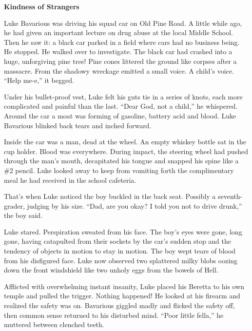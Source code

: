 

{\bf Kindness of Strangers}



Luke Bavarious was driving his squad car on Old Pine Road. A little
while ago, he had given an important lecture on drug abuse at the
local Middle School. Then he saw it: a black car parked in a field
where cars had no business being. He stopped. He walked over to
investigate. The black car had crashed into a huge, unforgiving
pine tree! Pine cones littered the ground like corpses after a
massacre. From the shadowy wreckage emitted a small voice. A
child's voice. ``Help me-e,'' it begged.



Under his bullet-proof vest, Luke felt his guts tie in a series of
knots, each more complicated and painful than the last. ``Dear
God, not a child,'' he whispered. Around the car a moat was
forming of gasoline, battery acid and blood. Luke Bavarious blinked
back tears and inched forward.



Inside the car was a man, dead at the wheel. An empty whiskey
bottle sat in the cup holder. Blood was everywhere. During impact,
the steering wheel had pushed through the man's mouth,
decapitated his tongue and snapped his spine like a \#2 pencil. Luke
looked away to keep from vomiting forth the complimentary meal he
had received in the school cafeteria.



That's when Luke noticed the boy buckled in the back seat.
Possibly a seventh-grader, judging by his size. ``Dad, are you
okay? I told you not to drive drunk,'' the boy said.



Luke stared. Perspiration sweated from his face. The boy's
eyes were gone, long gone, having catapulted from their sockets by
the car's sudden stop and the tendency of objects in motion
to stay in motion. The boy wept tears of blood from his disfigured
face. Luke now observed two splattered milky blobs oozing down the
front windshield like two unholy eggs from the bowels of
Hell.



Afflicted with overwhelming instant insanity, Luke placed his
Beretta to his own temple and pulled the trigger. Nothing happened!
He looked at his firearm and realized the safety was on. Bavarious
giggled madly and flicked the safety off, then common sense
returned to his disturbed mind. ``Poor little fella,'' he
muttered between clenched teeth.



